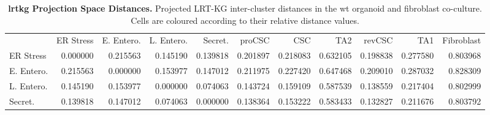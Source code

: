 \begin{table}
    \centering
    \caption{\textbf{\acrshort{lrtkg} Projection Space Distances.} Projected LRT-KG inter-cluster distances in the \acrshort{wt} organoid and fibroblast co-culture. Cells are coloured according to their relative distance values.}
    \label{tab:kgdistlrt}
    \begin{tabular}{lrrrrrrrrrr}
        {} & {ER Stress} & {E. Entero.} & {L. Entero.} & {Secret.} & {proCSC} & {CSC} & {TA2} & {revCSC} & {TA1} & {Fibroblast} \\
        ER Stress & {\cellcolor[HTML]{000004}} \color[HTML]{F1F1F1} 0.000000 & {\cellcolor[HTML]{490B6A}} \color[HTML]{F1F1F1} 0.215563 & {\cellcolor[HTML]{290B55}} \color[HTML]{F1F1F1} 0.145190 & {\cellcolor[HTML]{260C51}} \color[HTML]{F1F1F1} 0.139818 & {\cellcolor[HTML]{420A68}} \color[HTML]{F1F1F1} 0.201897 & {\cellcolor[HTML]{490B6A}} \color[HTML]{F1F1F1} 0.218083 & {\cellcolor[HTML]{E55C30}} \color[HTML]{F1F1F1} 0.632105 & {\cellcolor[HTML]{400A67}} \color[HTML]{F1F1F1} 0.198838 & {\cellcolor[HTML]{62146E}} \color[HTML]{F1F1F1} 0.277580 & {\cellcolor[HTML]{FCA60C}} \color[HTML]{000000} 0.803968 \\
        E. Entero. & {\cellcolor[HTML]{490B6A}} \color[HTML]{F1F1F1} 0.215563 & {\cellcolor[HTML]{000004}} \color[HTML]{F1F1F1} 0.000000 & {\cellcolor[HTML]{2D0B59}} \color[HTML]{F1F1F1} 0.153977 & {\cellcolor[HTML]{290B55}} \color[HTML]{F1F1F1} 0.147012 & {\cellcolor[HTML]{470B6A}} \color[HTML]{F1F1F1} 0.211975 & {\cellcolor[HTML]{4D0D6C}} \color[HTML]{F1F1F1} 0.227420 & {\cellcolor[HTML]{E9612B}} \color[HTML]{F1F1F1} 0.647468 & {\cellcolor[HTML]{450A69}} \color[HTML]{F1F1F1} 0.209010 & {\cellcolor[HTML]{65156E}} \color[HTML]{F1F1F1} 0.287032 & {\cellcolor[HTML]{FCB418}} \color[HTML]{000000} 0.828309 \\
        L. Entero. & {\cellcolor[HTML]{290B55}} \color[HTML]{F1F1F1} 0.145190 & {\cellcolor[HTML]{2D0B59}} \color[HTML]{F1F1F1} 0.153977 & {\cellcolor[HTML]{000004}} \color[HTML]{F1F1F1} 0.000000 & {\cellcolor[HTML]{0D0829}} \color[HTML]{F1F1F1} 0.074063 & {\cellcolor[HTML]{280B53}} \color[HTML]{F1F1F1} 0.143724 & {\cellcolor[HTML]{2F0A5B}} \color[HTML]{F1F1F1} 0.159109 & {\cellcolor[HTML]{D94D3D}} \color[HTML]{F1F1F1} 0.587539 & {\cellcolor[HTML]{260C51}} \color[HTML]{F1F1F1} 0.138559 & {\cellcolor[HTML]{490B6A}} \color[HTML]{F1F1F1} 0.217404 & {\cellcolor[HTML]{FCA60C}} \color[HTML]{000000} 0.802999 \\
        Secret. & {\cellcolor[HTML]{260C51}} \color[HTML]{F1F1F1} 0.139818 & {\cellcolor[HTML]{290B55}} \color[HTML]{F1F1F1} 0.147012 & {\cellcolor[HTML]{0D0829}} \color[HTML]{F1F1F1} 0.074063 & {\cellcolor[HTML]{000004}} \color[HTML]{F1F1F1} 0.000000 & {\cellcolor[HTML]{260C51}} \color[HTML]{F1F1F1} 0.138364 & {\cellcolor[HTML]{2D0B59}} \color[HTML]{F1F1F1} 0.153222 & {\cellcolor[HTML]{D84C3E}} \color[HTML]{F1F1F1} 0.583433 & {\cellcolor[HTML]{240C4F}} \color[HTML]{F1F1F1} 0.132827 & {\cellcolor[HTML]{470B6A}} \color[HTML]{F1F1F1} 0.211676 & {\cellcolor[HTML]{FCA60C}} \color[HTML]{000000} 0.803792 \\

\end{tabular}
\end{table}
